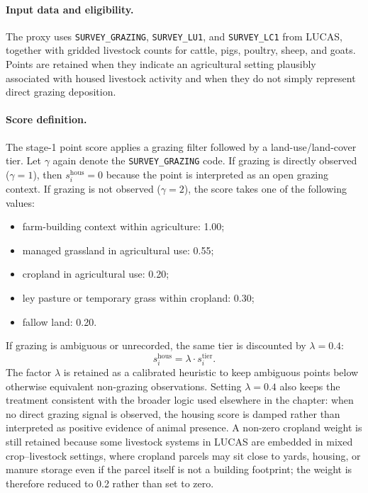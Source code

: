 \paragraph{Input data and eligibility.}
The proxy uses \texttt{SURVEY\_GRAZING}, \texttt{SURVEY\_LU1}, and
\texttt{SURVEY\_LC1} from LUCAS, together with gridded livestock counts
for cattle, pigs, poultry, sheep, and goats. Points are retained when
they indicate an agricultural setting plausibly associated with housed
livestock activity and when they do not simply represent direct grazing
deposition.

\paragraph{Score definition.}
The stage-1 point score applies a grazing filter followed by a
land-use/land-cover tier. Let $\gamma$ again denote the
\texttt{SURVEY\_GRAZING} code. If grazing is directly observed
($\gamma=1$), then $s_i^{\mathrm{hous}}=0$ because the point is
interpreted as an open grazing context. If grazing is not observed
($\gamma=2$), the score takes one of the following values:
\begin{itemize}
  \setlength{\itemsep}{0.2em}
  \setlength{\parskip}{0pt}
  \item farm-building context within agriculture: 1.00;
  \item managed grassland in agricultural use: 0.55;
  \item cropland in agricultural use: 0.20;
  \item ley pasture or temporary grass within cropland: 0.30;
  \item fallow land: 0.20.
\end{itemize}
If grazing is ambiguous or unrecorded, the same tier is discounted by
$\lambda=0.4$:
\begin{equation}
  s_i^{\mathrm{hous}} = \lambda \cdot s_i^{\mathrm{tier}}.
\end{equation}
The factor $\lambda$ is retained as a calibrated heuristic to keep
ambiguous points below otherwise equivalent non-grazing observations.
Setting $\lambda=0.4$ also keeps the treatment consistent with the
broader logic used elsewhere in the chapter: when no direct grazing
signal is observed, the housing score is damped rather than interpreted
as positive evidence of animal presence. A non-zero cropland weight is
still retained because some livestock systems in LUCAS are embedded in
mixed crop--livestock settings, where cropland parcels may sit close to
yards, housing, or manure storage even if the parcel itself is not a
building footprint; the weight is therefore reduced to 0.2 rather than
set to zero.

